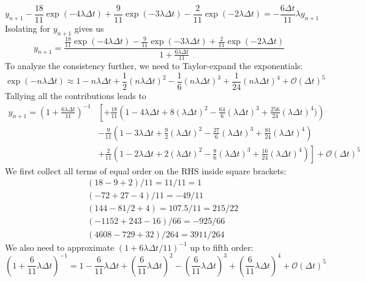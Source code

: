 \documentclass[10pt,a4paper]{article}
\begin{document}
\begin{equation*}
  y_{n+1} - \frac{18}{11}\exp(-4\lambda \Delta t) + \frac{ 9}{11}\exp(-3\lambda \Delta t) - \frac{2}{11}\exp(-2\lambda \Delta t) = -\frac{6\Delta t}{11}\lambda y_{n+1}
\end{equation*}
Isolating for $y_{n+1}$ gives us
\begin{equation*}
  y_{n+1} = \frac{\frac{18}{11}\exp(-4\lambda \Delta t) - \frac{ 9}{11}\exp(-3\lambda \Delta t) + \frac{2}{11}\exp(-2\lambda \Delta t)}{1 + \frac{6 \lambda\Delta t}{11}}
\end{equation*}
To analyze the consistency further, we need to Taylor-expand the exponentials:
\begin{equation*}
  \exp(-n\lambda \Delta t) \approx 1 - n\lambda \Delta t + \frac{1}{2}(n\lambda \Delta t)^2 - \frac{1}{6}(n\lambda \Delta t)^3 + \frac{1}{24}(n\lambda \Delta t)^4 + \mathcal{O}(\Delta t)^5
\end{equation*}
Tallying all the contributions leads to
\begin{align*}
  y_{n+1} = (1+\frac{6\lambda \Delta t}{11})^{-1}&\left[+\frac{18}{11}\left(1 - 4\lambda \Delta t + 8(\lambda \Delta t)^2 - \frac{64}{6}(\lambda \Delta t)^3 + \frac{256}{24}(\lambda \Delta t)^4)\right)\right. \\
                                                 &\left.-\frac{9}{11}\left(1 - 3\lambda \Delta t + \frac{9}{2}(\lambda \Delta t)^2 - \frac{27}{6}(\lambda \Delta t)^3 + \frac{81}{24}(\lambda \Delta t)^4\right) \right. \\
  &+\left.\frac{2}{11}\left( 1 - 2\lambda \Delta t + 2(\lambda \Delta t)^2 - \frac{8}{6}(\lambda \Delta t)^3 + \frac{16}{24}(\lambda \Delta t)^4 \right)\right] + \mathcal{O}(\Delta t)^5
\end{align*}
We first collect all terms of equal order on the RHS inside square brackets:
\begin{align*}
  &(18 - 9 + 2)/11 = 11/11 = 1\\
  &(-72 + 27 - 4)/11 = -49/11 \\
  &(144 - 81/2 + 4) = 107.5/11 = 215/22\\
  &(-1152+243-16)/66 = -925/66 \\
  &(4608 - 729 + 32)/264 = 3911/264
\end{align*}
We also need to approximate $(1+6\lambda \Delta t/11)^{-1}$ up to fifth order:
\begin{equation*}
  \left(1+\frac{6}{11}\lambda \Delta t\right)^{-1} = 1 - \frac{6}{11}\lambda \Delta t + \left(\frac{6}{11}\lambda \Delta t\right)^2 - \left(\frac{6}{11}\lambda \Delta t\right)^3 + \left(\frac{6}{11}\lambda \Delta t\right)^4 + \mathcal{O}(\Delta t)^5
\end{equation*}
\end{document}

